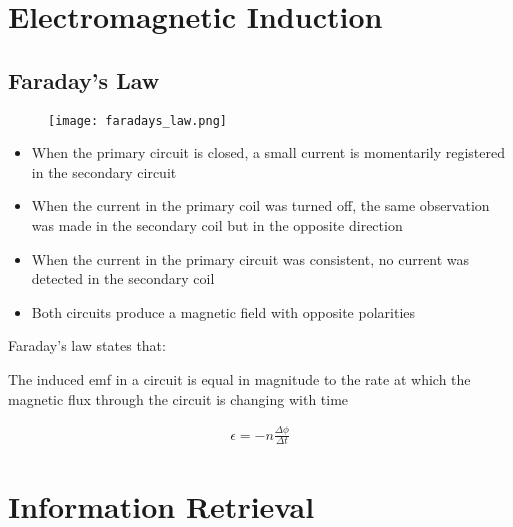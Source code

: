 \section{Electromagnetic Induction} \label{04/03/2025}

	\subsection{Faraday's Law}
		\begin{figure}[htbp]
			\centering
			\texttt{[image: faradays\_law.png]}
		\end{figure}

		\begin{itemize}
			\item When the primary circuit is closed, a small current is momentarily registered in the secondary circuit
			\item When the current in the primary coil was turned off, the same observation was made in the secondary coil but in the opposite direction
			\item When the current in the primary circuit was consistent, no current was detected in the secondary coil
			\item Both circuits produce a magnetic field with opposite polarities
		\end{itemize}
		
		Faraday's law states that:

		\begin{center}
			\Large The induced emf in a circuit is equal in magnitude to the rate at which the magnetic flux through the circuit is changing with time
		\end{center}

		\begin{align*}
			\epsilon = -n \frac{\Delta \phi}{\Delta t}
		\end{align*}

\newpage

\section{Information Retrieval} \label{10/03/2025}

